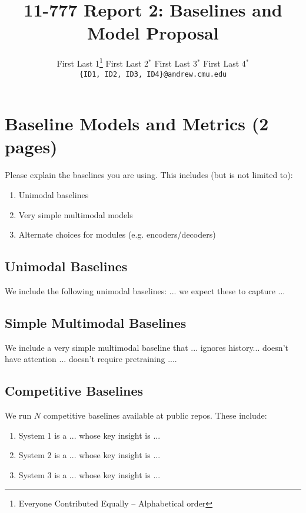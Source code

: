 \documentclass[11pt,a4paper]{article}
\title{11-777 Report 2: Baselines and Model Proposal}
\author{
  First Last 1\thanks{\hspace{4pt}Everyone Contributed Equally -- Alphabetical order} \hspace{2em} First Last 2$^*$ \hspace{2em} First Last 3$^*$ \hspace{2em} First Last 4$^*$ \\
  \texttt{\{ID1, ID2, ID3, ID4\}@andrew.cmu.edu}
  }
\date{}
\begin{document}
\maketitle

\section{Baseline Models and Metrics (2 pages)}
Please explain the baselines you are using. This includes (but is not limited to):
\begin{enumerate}
  \item Unimodal baselines
  \item Very simple multimodal models  
  \item Alternate choices for modules (e.g. encoders/decoders)
\end{enumerate}

\subsection{Unimodal Baselines}
We include the following unimodal baselines: ... we expect these to capture ...

\subsection{Simple Multimodal Baselines}
We include a very simple multimodal baseline that ... ignores history... doesn't have attention ... doesn't require pretraining ....

\subsection{Competitive Baselines}
We run $N$ competitive baselines available at public repos.  These include: 
\begin{enumerate}
  \item System 1 is a ... whose key insight is ... 
  \item System 2 is a ... whose key insight is ... 
  \item System 3 is a ... whose key insight is ... 
\end{enumerate}
\end{document}
